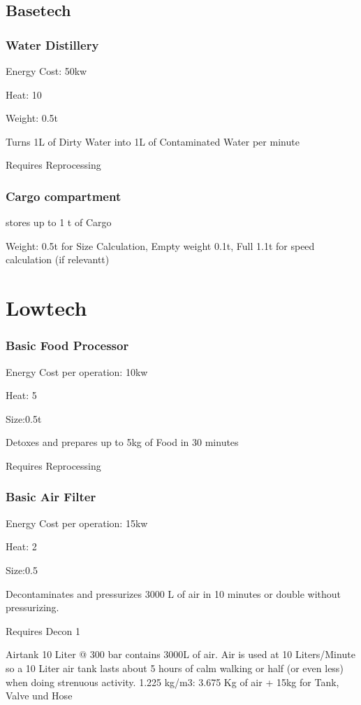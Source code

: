 \subsection{Basetech}\label{subsec:basetech}
\subsubsection{Water Distillery}\label{subsubsec:water-distillery}
Energy Cost: 50kw\par
Heat: 10\par
Weight: 0.5t\par
Turns 1L of Dirty Water into 1L of Contaminated Water per minute\par
Requires Reprocessing\par
\par

\subsubsection{Cargo compartment}\label{subsubsec:cargo-compartment}
stores up to 1 t of Cargo\par
Weight: 0.5t for Size Calculation, Empty weight 0.1t, Full 1.1t for speed calculation (if relevantt)
\par
\section{Lowtech}\label{sec:lowtech}
\subsubsection{Basic Food Processor}
Energy Cost per operation: 10kw \par
Heat: 5 \par
Size:0.5t\par
Detoxes and prepares up to 5kg of Food in 30 minutes \par
Requires Reprocessing\par

\subsubsection{Basic Air Filter}
Energy Cost per operation: 15kw \par
Heat: 2\par
Size:0.5\par
Decontaminates and pressurizes 3000 L of air in  10 minutes or double without pressurizing. \par
Requires Decon 1\par
Airtank 10 Liter @ 300 bar contains 3000L of air.
Air is used at 10 Liters/Minute so a 10 Liter air tank lasts about 5 hours of calm
walking or half (or even less) when doing strenuous activity.
1.225 kg/m3: 3.675 Kg of air
+ 15kg for Tank, Valve und Hose
\par
